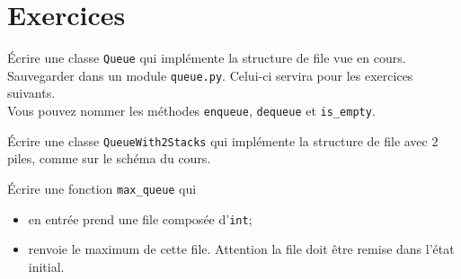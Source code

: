 \documentclass[10pt,firamath,cours]{nsi}
\begin{document}
\section{Exercices}

\begin{exercice}
	\'Ecrire une classe \texttt{Queue} qui implémente la structure de file vue en cours. Sauvegarder dans un module \texttt{queue.py}. Celui-ci servira pour les exercices suivants.\\
    
    Vous pouvez nommer les méthodes \texttt{enqueue}, \texttt{dequeue} et \texttt{is_empty}.
\end{exercice}

\begin{exercice}
\'Ecrire une classe \texttt{QueueWith2Stacks} qui implémente la structure de file avec 2 piles, comme sur le schéma du cours.
\end{exercice}

\begin{exercice}
    
\'Ecrire une fonction \texttt{max_queue} qui
\begin{itemize}
    \item 	en entrée prend une file composée d'\texttt{int};
    \item 	renvoie le maximum de cette file. Attention la file doit être remise dans l'état initial.
\end{itemize}
\end{exercice}
\end{document}
